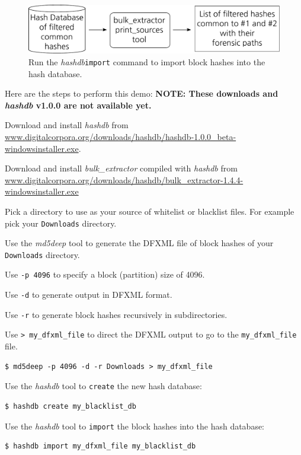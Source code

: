 \documentclass[12pt,twoside]{article}
\newcommand{\hdb}{\emph{hashdb}\xspace}
\newcommand{\bulk}{\emph{bulk\_extractor}\xspace}
\newcommand{\mdd}{\emph{md5deep}\xspace}
\begin{document}
\begin{figure}[H]
  \center
  \includegraphics[scale=0.6]{drawings/import}
  \caption*{Run the \hdb \texttt{import} command
            to import block hashes into the hash database.}
\end{figure}

Here are the steps to perform this demo:
\textbf{NOTE: These downloads and \hdb v1.0.0 are not available yet.}
\begin{compactenum}
\item Download and install \hdb from
\url{www.digitalcorpora.org/downloads/hashdb/hashdb-1.0.0\_beta-windowsinstaller.exe}.
\item Download and install \bulk compiled with \hdb from
\url{www.digitalcorpora.org/downloads/hashdb/bulk\_extractor-1.4.4-windowsinstaller.exe}
\item Pick a directory to use as your source of whitelist or blacklist files.
For example pick your \texttt{Downloads} directory.

\item Use the \mdd tool to generate the DFXML file of block hashes
of your \texttt{Downloads} directory.
\begin{compactitem}
\item Use \texttt{-p 4096} to specify a block (partition) size of 4096.
\item Use \texttt{-d} to generate output in DFXML format.
\item Use \texttt{-r} to generate block hashes recursively in subdirectories.
\item Use \texttt{> my\_dfxml\_file} to direct the DFXML output
to go to the \texttt{my\_dfxml\_file} file.
\end{compactitem}
\begin{verbatim}
$ md5deep -p 4096 -d -r Downloads > my_dfxml_file
\end{verbatim}

\item Use the \hdb tool to \texttt{create} the new hash database:
\begin{verbatim}
$ hashdb create my_blacklist_db
\end{verbatim}

\item Use the \hdb tool to \texttt{import} the block hashes
into the hash database:
\begin{verbatim}
$ hashdb import my_dfxml_file my_blacklist_db
\end{verbatim}
\end{compactenum}
\end{document}
